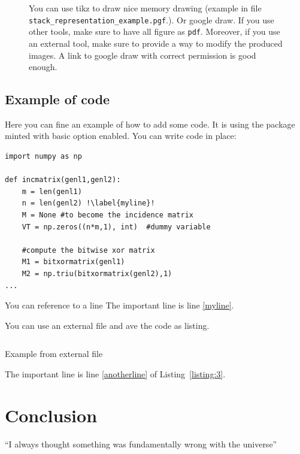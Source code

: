 \documentclass{article}
\begin{document}
\begin{figure}[tbh]
\centering

 \caption{You can use tikz to draw nice memory drawing (example in file \texttt{stack\_representation\_example.pgf}.). Or google draw.  If you use other tools, make sure to have all figure as \texttt{pdf}. Moreover, if you use an external tool, make sure to provide a way to modify the produced images. A link to google draw with correct permission is good enough.}
\label{general-stolen-api}
\end{figure} 


\subsection{Example of code}
Here you can fine an example of how to add some code. It is using the package minted with basic option enabled.
You can write code in place:
\begin{verbatim}
import numpy as np
    
def incmatrix(genl1,genl2):
    m = len(genl1)
    n = len(genl2) !\label{myline}!
    M = None #to become the incidence matrix
    VT = np.zeros((n*m,1), int)  #dummy variable
    
    #compute the bitwise xor matrix
    M1 = bitxormatrix(genl1)
    M2 = np.triu(bitxormatrix(genl2),1) 
...
\end{verbatim}
You can reference to a line
The important line is line \ref{myline}.

You can use an external file and ave the code as listing.
\begin{listing}[ht]
\inputminted[linenos, bgcolor=black, escapeinside=!!]{python}{x.py}
\caption{Example from external file}
\label{listing:3}
\end{listing}

The important line is line \ref{anotherline} of Listing~\ref{listing:3}.

\section{Conclusion}
``I always thought something was fundamentally wrong with the universe'' \citep{adams1995hitchhiker}



\end{document}
